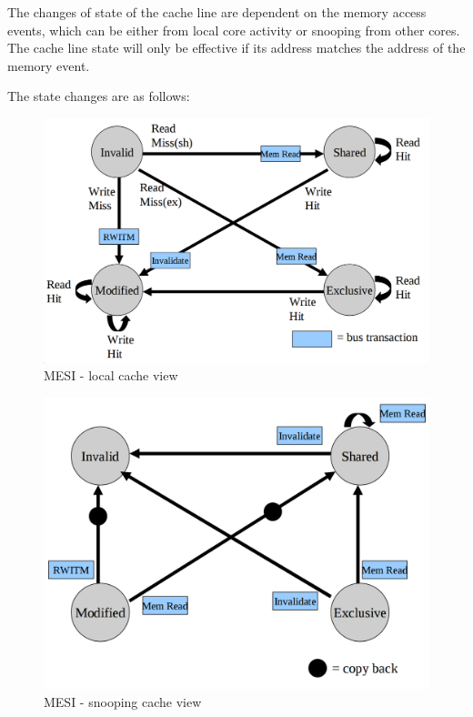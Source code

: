
The changes of state of the cache line are dependent on the memory access
events, which can be either from local core activity or snooping from other
cores. The cache line state will only be effective if its address matches the
address of the memory event.

The state changes are as follows:

\begin{figure}[H]
  \includegraphics[width=\textwidth]{images/MESI1}
  \caption{MESI - local cache view}
  \label{MESI1}
\end{figure}


\begin{figure}[H]
  \includegraphics[width=\textwidth]{images/MESI2}
  \caption{MESI - snooping cache view}
  \label{MESI2}
\end{figure}


